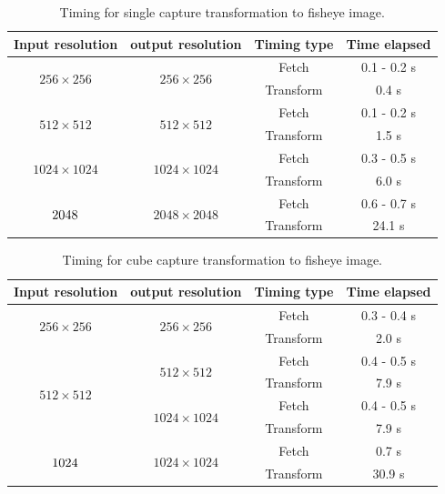 \begin{table}[!htb]
    \centering
    \caption{Timing for single capture transformation to fisheye image.}
    \label{tab:res_timing_single}
    \begin{tabular}{|c|c|c|c|} \hline
        \textbf{Input resolution} & \textbf{output resolution} & \textbf{Timing type} & \textbf{Time elapsed} \\ \hline \hline
        \multirow{2}{*}{$256 \times 256$} & \multirow{2}{*}{$256 \times 256$} & Fetch & 0.1 - 0.2 s \\ \cline{3-4}
         & & Transform & 0.4 s \\ \hline
        \multirow{2}{*}{$512 \times 512$} & \multirow{2}{*}{$512 \times 512$} & Fetch & 0.1 - 0.2 s\\ \cline{3-4}
         & & Transform & 1.5 s \\ \hline
        \multirow{2}{*}{$1024 \times 1024$} & \multirow{2}{*}{$1024 \times 1024$} & Fetch &  0.3 - 0.5 s \\ \cline{3-4}
         & & Transform & 6.0 s \\ \hline
        \multirow{2}{*}{$2048 \time 2048$} & \multirow{2}{*}{$2048 \times 2048$} & Fetch & 0.6 - 0.7 s\\ \cline{3-4}
         & & Transform & 24.1 s\\ \hline
    \end{tabular}
\end{table}

\begin{table}[!htb]
    \centering
    \caption{Timing for cube capture transformation to fisheye image.}
    \label{tab:res_timing_cube_capture}
    \begin{tabular}{|c|c|c|c|} \hline
        \textbf{Input resolution} & \textbf{output resolution} & \textbf{Timing type} & \textbf{Time elapsed} \\ \hline \hline
        \multirow{2}{*}{$256 \times 256$} & \multirow{2}{*}{$256 \times 256$} & Fetch & 0.3 - 0.4 s\\ \cline{3-4}
         & & Transform & 2.0 s\\ \hline
        \multirow{4}{*}{$512 \times 512$} & \multirow{2}{*}{$512 \times 512$} & Fetch & 0.4 - 0.5 s \\ \cline{3-4}
         & & Transform & 7.9 s\\ \cline{2-4}
         & \multirow{2}{*}{$1024 \times 1024$} & Fetch & 0.4 - 0.5 s\\ \cline{3-4}
         & & Transform & 7.9 s\\ \hline
        \multirow{2}{*}{$1024 \time 1024$} & \multirow{2}{*}{$1024 \times 1024$} & Fetch & 0.7 s\\ \cline{3-4}
         & & Transform & 30.9 s\\ \hline
    \end{tabular}
\end{table}


